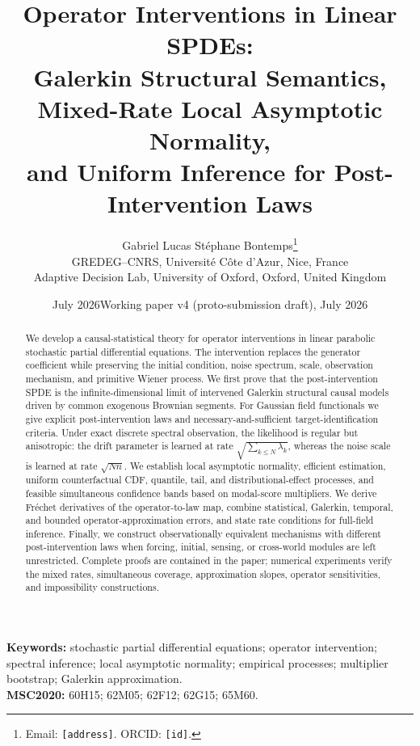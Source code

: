 \documentclass[10pt]{article}
\title{\textbf{Operator Interventions in Linear SPDEs:\\
Galerkin Structural Semantics, Mixed-Rate Local Asymptotic Normality,\\
and Uniform Inference for Post-Intervention Laws}}
\author{Gabriel Lucas St\'ephane Bontemps\thanks{Email:
\texttt{[address]}. ORCID: \texttt{[id]}.}\\[2pt]
{\normalsize GREDEG--CNRS, Universit\'e C\^ote d'Azur, Nice, France}\\
{\normalsize Adaptive Decision Lab, University of Oxford, Oxford, United Kingdom}}
\date{\ifdefined\SUBMISSIONCLEAN July 2026\else Working paper v4 (proto-submission draft), July 2026\fi}
\theoremstyle{remark}
\providecommand{\1}{\mathbf 1}
\begin{document}
\maketitle

\begin{abstract}
We develop a causal-statistical theory for operator interventions in linear parabolic stochastic partial differential equations. The intervention replaces the generator coefficient while preserving the initial condition, noise spectrum, scale, observation mechanism, and primitive Wiener process. We first prove that the post-intervention SPDE is the infinite-dimensional limit of intervened Galerkin structural causal models driven by common exogenous Brownian segments. For Gaussian field functionals we give explicit post-intervention laws and necessary-and-sufficient target-identification criteria. Under exact discrete spectral observation, the likelihood is regular but anisotropic: the drift parameter is learned at rate $\sqrt{\sum_{k\le N}\lambda_k}$, whereas the noise scale is learned at rate $\sqrt{Nn}$. We establish local asymptotic normality, efficient estimation, uniform counterfactual CDF, quantile, tail, and distributional-effect processes, and feasible simultaneous confidence bands based on modal-score multipliers. We derive Fr\'echet derivatives of the operator-to-law map, combine statistical, Galerkin, temporal, and bounded operator-approximation errors, and state rate conditions for full-field inference. Finally, we construct observationally equivalent mechanisms with different post-intervention laws when forcing, initial, sensing, or cross-world modules are left unrestricted. Complete proofs are contained in the paper; numerical experiments verify the mixed rates, simultaneous coverage, approximation slopes, operator sensitivities, and impossibility constructions.
\end{abstract}

\noindent\textbf{Keywords:} stochastic partial differential equations; operator intervention; spectral inference; local asymptotic normality; empirical processes; multiplier bootstrap; Galerkin approximation.\\
\textbf{MSC2020:} 60H15; 62M05; 62F12; 62G15; 65M60.









\end{document}
